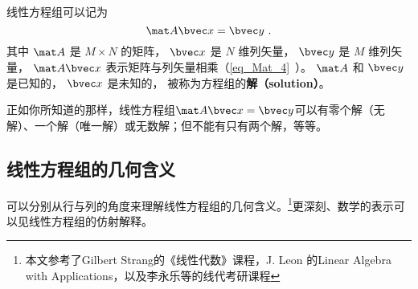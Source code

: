 
\begin{issues}
\issueDraft
\end{issues}


线性方程组可以记为
\begin{equation}\label{eq_LinEq_1}
\mat A \bvec x = \bvec y~.
\end{equation}
其中 $\mat A$ 是 $M \times N$ 的矩阵， $\bvec x$ 是 $N$ 维列矢量， $\bvec y$ 是 $M$ 维列矢量， $\mat A \bvec x$ 表示矩阵与列矢量相乘（\autoref{eq_Mat_4}~）。 $\mat A$ 和 $\bvec y$ 是已知的， $\bvec x$ 是未知的， 被称为方程组的\textbf{解（solution）}。

正如你所知道的那样，线性方程组$\mat A \bvec x=\bvec y$可以有零个解（无解）、一个解（唯一解）或无数解；但不能有只有两个解，等等。


\subsection{线性方程组的几何含义}\label{sub_LinEq_2}
可以分别从行与列的角度来理解线性方程组的几何含义。\footnote{本文参考了Gilbert Strang的《线性代数》课程，J. Leon 的Linear Algebra with Applications，以及李永乐等的线代考研课程}更深刻、数学的表示可以见线性方程组的仿射解释。

